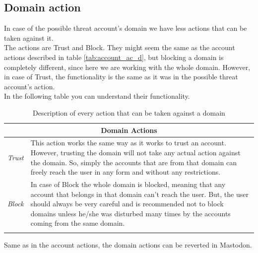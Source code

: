 \subsection{Domain action}
In case of the possible threat account's domain we have less actions that can be taken against it. 
\\[5pt]
The actions are Trust and Block. They might seem the same as the account actions described in table \ref{tab:account_ac_d}, but blocking a domain is completely different, since here we are working with the whole domain. However, in case of Trust, the functionality is the same as it was in the possible threat account's action.
\\[5pt]
In the following table you can understand their functionality.
\begin{center}
	\begin{longtable}{ | p{} | p{} | }
		
		\hline
		\multicolumn{2}{|c|}{\textbf{Domain Actions}}
		\\ \hline
		
		
		\hline
		\endfirsthead %
		
		\hline
		\hline
		\endhead %
		
		\hline
		\endfoot %
		
		\endlastfoot %
		
		\emph{Trust}
		& This action works the same way as it works to trust an account. However, trusting the domain will not take any actual action against the domain. So, simply the accounts that are from that domain can freely reach the user in any form and without any restrictions.
		\\ \hline
		
		\emph{Block}
		& In case of Block the whole domain is blocked, meaning that any account that belongs in that domain can't reach the user. But, the user should always be very careful and is recommended not to block domains unless he/she was disturbed many times by the accounts coming from the same domain.
		\\ \hline

		\caption{Description of every action that can be taken against a domain}
		\label{tab:account_do_d}		
	\end{longtable}
\end{center}
Same as in the account actions, the domain actions can be reverted in Mastodon.
